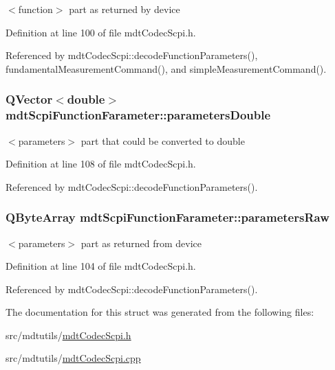 $<$function$>$ part as returned by device 



Definition at line 100 of file mdt\-Codec\-Scpi.\-h.



Referenced by mdt\-Codec\-Scpi\-::decode\-Function\-Parameters(), fundamental\-Measurement\-Command(), and simple\-Measurement\-Command().

\hypertarget{structmdt_scpi_function_farameter_add88cf91c824eb5c317f21a3f2c77503}{
\subsubsection[{parameters\-Double}]{\setlength{\rightskip}{0pt plus 5cm}Q\-Vector$<$double$>$ mdt\-Scpi\-Function\-Farameter\-::parameters\-Double}}\label{structmdt_scpi_function_farameter_add88cf91c824eb5c317f21a3f2c77503}


$<$parameters$>$ part that could be converted to double 



Definition at line 108 of file mdt\-Codec\-Scpi.\-h.



Referenced by mdt\-Codec\-Scpi\-::decode\-Function\-Parameters().

\hypertarget{structmdt_scpi_function_farameter_a6e862b52cdb9e1d5c45123b6382db675}{
\subsubsection[{parameters\-Raw}]{\setlength{\rightskip}{0pt plus 5cm}Q\-Byte\-Array mdt\-Scpi\-Function\-Farameter\-::parameters\-Raw}}\label{structmdt_scpi_function_farameter_a6e862b52cdb9e1d5c45123b6382db675}


$<$parameters$>$ part as returned from device 



Definition at line 104 of file mdt\-Codec\-Scpi.\-h.



Referenced by mdt\-Codec\-Scpi\-::decode\-Function\-Parameters().



The documentation for this struct was generated from the following files\-:\begin{DoxyCompactItemize}
\item 
src/mdtutils/\hyperlink{mdt_codec_scpi_8h}{mdt\-Codec\-Scpi.\-h}\item 
src/mdtutils/\hyperlink{mdt_codec_scpi_8cpp}{mdt\-Codec\-Scpi.\-cpp}\end{DoxyCompactItemize}
